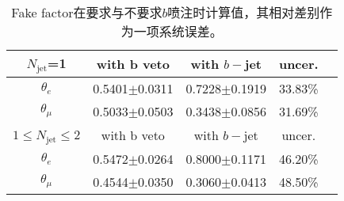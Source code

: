 \begin{table}[h]
\begin{center}
\begin{tabular}{c|cccc}
\hline
\hline
$N_{\text{jet}}$=1 &with b veto &with $b-$jet  &uncer.  \\
\hline
$\theta_{e}$ &0.5401$\pm$0.0311    &0.7228$\pm$0.1919 &33.83\% \\
$\theta_{\mu}$ &0.5033$\pm$0.0503   &0.3438$\pm$0.0856 &31.69\% \\
\hline
\hline
$1\leq N_{\text{jet}} \leq$2 &with b veto &with $b-$jet  &uncer.  \\
\hline
$\theta_{e}$  &0.5472$\pm$0.0264   &0.8000$\pm$0.1171  &46.20\%  \\
$\theta_{\mu}$  &0.4544$\pm$0.0350  &0.3060$\pm$0.0413 &48.50\%  \\
\hline
\hline
\end{tabular}
\caption{Fake factor在要求与不要求$b$喷注时计算值，其相对差别作为一项系统误差。}
\label{tab:ff_syst_sample_composition}
\end{center}
\end{table}
